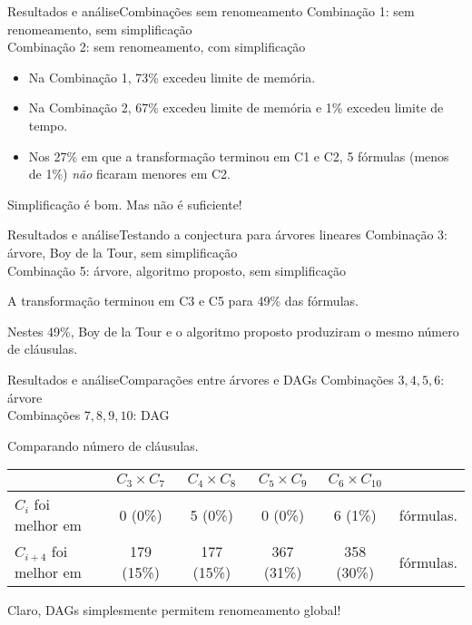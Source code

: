 \begin{frame}{Resultados e análise}{Combinações sem renomeamento}
	Combinação 1: sem renomeamento, sem simplificação\\
	Combinação 2: sem renomeamento, com simplificação
	
	\begin{itemize}
		\pause\item Na Combinação 1, 73\% excedeu limite de memória.
		\pause\item Na Combinação 2, 67\% excedeu limite de memória e 1\% excedeu limite de tempo.
		\pause\item Nos 27\% em que a transformação terminou em C1 e C2, 5 fórmulas (menos de 1\%) \emph{não} ficaram menores em C2.
	\end{itemize}
	
	\pause Simplificação é bom. \pause Mas não é suficiente!
\end{frame}

\begin{frame}{Resultados e análise}{Testando a conjectura para árvores lineares}
	Combinação 3: árvore, Boy de la Tour, sem simplificação\\
	Combinação 5: árvore, algoritmo proposto, sem simplificação
	
	\pause A transformação terminou em C3 e C5 para 49\% das fórmulas.
	
	\pause Nestes 49\%, Boy de la Tour e o algoritmo proposto produziram o mesmo número de cláusulas.
\end{frame}

\begin{frame}{Resultados e análise}{Comparações entre árvores e DAGs}
	Combinações $3,4,5,6$: árvore\\
	Combinações $7,8,9,10$: DAG
	
	\vspace{.1cm}
	\pause \begin{center}Comparando número de cláusulas.\end{center}
	\begin{scriptsize}
	\begin{tabular}{l|c|c|c|c|l}
		& $C_3 \times C_7$ & $C_4 \times C_8$ & $C_5 \times C_9$ & $C_6 \times C_{10}$ \\ \hline
		$C_i$ foi melhor em & 0 (0\%)     & 5 (0\%)     & 0 (0\%)     & 6 (1\%)      & fórmulas. \\
		$C_{i+4}$ foi melhor em   & 179 (15\%)  & 177 (15\%)  & 367 (31\%)  & 358 (30\%)   & fórmulas. \\
	\end{tabular}
	\end{scriptsize}
	
	\vspace{.1cm}
	\pause Claro, DAGs simplesmente permitem renomeamento global!
\end{frame}

